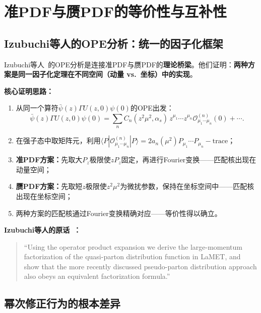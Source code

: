 \documentclass[12pt,a4paper]{ctexart}
\theoremstyle{definition}
\begin{document}
\section{准PDF与赝PDF的等价性与互补性}

\subsection{Izubuchi等人的OPE分析：统一的因子化框架}

Izubuchi等人~\cite{Izubuchi2018}的OPE分析是连接准PDF与赝PDF的\textbf{理论桥梁}。他们证明：\textbf{两种方案是同一因子化定理在不同空间（动量 vs.\ 坐标）中的实现}。

\textbf{核心证明思路：}
\begin{enumerate}[nosep]
    \item 从同一个算符$\bar\psi(z)\Gamma U(z,0)\psi(0)$的OPE出发：
    \begin{equation}
    \bar\psi(z)\Gamma U(z,0)\psi(0) = \sum_{n} C_n(z^2\mu^2, \alpha_s) \, z^{\mu_1}\cdots z^{\mu_n} \mathcal{O}^{(n)}_{\mu_1\cdots\mu_n}(0) + \cdots.
    \end{equation}
    \item 在强子态中取矩阵元，利用$\langle P | \mathcal{O}^{(n)}_{\mu_1\cdots\mu_n} | P \rangle = 2a_n(\mu^2) P_{\mu_1}\cdots P_{\mu_n} - \text{trace}$；
    \item \textbf{准PDF方案：}先取大$P_z$极限使$zP_z$固定，再进行Fourier变换——匹配核出现在动量空间；
    \item \textbf{赝PDF方案：}先取短$z$极限使$z^2\mu^2$为微扰参数，保持在坐标空间中——匹配核出现在坐标空间；
    \item 两种方案的匹配核通过Fourier变换精确对应——等价性得以确立。
\end{enumerate}

\textbf{Izubuchi等人的原话~\cite{Izubuchi2018}：}
\begin{quote}
``Using the operator product expansion we derive the large-momentum factorization of the quasi-parton distribution function in LaMET, and show that the more recently discussed pseudo-parton distribution approach also obeys an equivalent factorization formula.''
\end{quote}

\subsection{幂次修正行为的根本差异}
\end{document}
